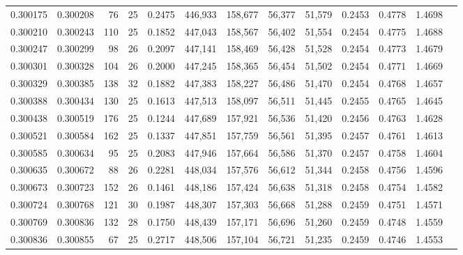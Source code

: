 \begin{tabular}{rrrrrrrrrrrrr}
0.300175 & 0.300208 &    76 &  25 &                                     0.2475 & 446,933 & 158,677 &  56,377 &  51,579 & 0.2453 & 0.4778 & 1.4698 \\
0.300210 & 0.300243 &   110 &  25 &                                     0.1852 & 447,043 & 158,567 &  56,402 &  51,554 & 0.2454 & 0.4775 & 1.4688 \\
0.300247 & 0.300299 &    98 &  26 &                                     0.2097 & 447,141 & 158,469 &  56,428 &  51,528 & 0.2454 & 0.4773 & 1.4679 \\
0.300301 & 0.300328 &   104 &  26 &                                     0.2000 & 447,245 & 158,365 &  56,454 &  51,502 & 0.2454 & 0.4771 & 1.4669 \\
0.300329 & 0.300385 &   138 &  32 &                                     0.1882 & 447,383 & 158,227 &  56,486 &  51,470 & 0.2454 & 0.4768 & 1.4657 \\
0.300388 & 0.300434 &   130 &  25 &                                     0.1613 & 447,513 & 158,097 &  56,511 &  51,445 & 0.2455 & 0.4765 & 1.4645 \\
0.300438 & 0.300519 &   176 &  25 &                                     0.1244 & 447,689 & 157,921 &  56,536 &  51,420 & 0.2456 & 0.4763 & 1.4628 \\
0.300521 & 0.300584 &   162 &  25 &                                     0.1337 & 447,851 & 157,759 &  56,561 &  51,395 & 0.2457 & 0.4761 & 1.4613 \\
0.300585 & 0.300634 &    95 &  25 &                                     0.2083 & 447,946 & 157,664 &  56,586 &  51,370 & 0.2457 & 0.4758 & 1.4604 \\
0.300635 & 0.300672 &    88 &  26 &                                     0.2281 & 448,034 & 157,576 &  56,612 &  51,344 & 0.2458 & 0.4756 & 1.4596 \\
0.300673 & 0.300723 &   152 &  26 &                                     0.1461 & 448,186 & 157,424 &  56,638 &  51,318 & 0.2458 & 0.4754 & 1.4582 \\
0.300724 & 0.300768 &   121 &  30 &                                     0.1987 & 448,307 & 157,303 &  56,668 &  51,288 & 0.2459 & 0.4751 & 1.4571 \\
0.300769 & 0.300836 &   132 &  28 &                                     0.1750 & 448,439 & 157,171 &  56,696 &  51,260 & 0.2459 & 0.4748 & 1.4559 \\
0.300836 & 0.300855 &    67 &  25 &                                     0.2717 & 448,506 & 157,104 &  56,721 &  51,235 & 0.2459 & 0.4746 & 1.4553 \\

\end{tabular}
